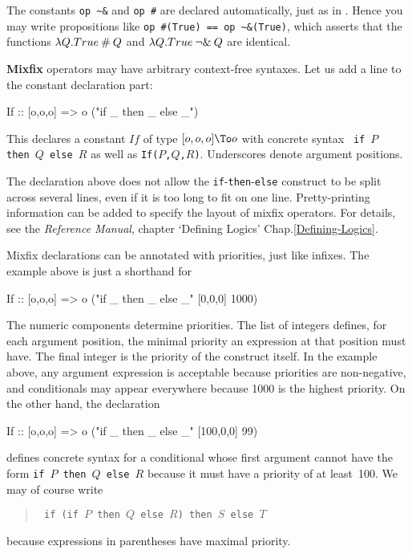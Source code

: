 The constants \hbox{\verb|op ~&|} and \hbox{\verb|op #|} are declared
automatically, just as in \ML.  Hence you may write propositions like
\verb|op #(True) == op ~&(True)|, which asserts that the functions $\lambda
Q.True \mathbin{\#} Q$ and $\lambda Q.True \mathbin{\lnot\&} Q$ are identical.

\bigskip{}
{\bf Mixfix} operators may have arbitrary context-free syntaxes.  Let us
add a line to the constant declaration part:
\begin{ttbox}
        If :: [o,o,o] => o       ("if _ then _ else _")
\end{ttbox}
This declares a constant $If$ of type $[o,o,o] \To o$ with concrete syntax {\tt
  if~$P$ then~$Q$ else~$R$} as well as {\tt If($P$,$Q$,$R$)}.  Underscores
denote argument positions.  

The declaration above does not allow the {\tt if}-{\tt then}-{\tt else}
construct to be split across several lines, even if it is too long to fit
on one line.  Pretty-printing information can be added to specify the
layout of mixfix operators.  For details, see
%
    {the {\it Reference Manual}, chapter `Defining Logics'}%
    {Chap.\ts\ref{Defining-Logics}}.

Mixfix declarations can be annotated with priorities, just like
infixes.  The example above is just a shorthand for
\begin{ttbox}
        If :: [o,o,o] => o       ("if _ then _ else _" [0,0,0] 1000)
\end{ttbox}
The numeric components determine priorities.  The list of integers
defines, for each argument position, the minimal priority an expression
at that position must have.  The final integer is the priority of the
construct itself.  In the example above, any argument expression is
acceptable because priorities are non-negative, and conditionals may
appear everywhere because 1000 is the highest priority.  On the other
hand, the declaration
\begin{ttbox}
        If :: [o,o,o] => o       ("if _ then _ else _" [100,0,0] 99)
\end{ttbox}
defines concrete syntax for a conditional whose first argument cannot have
the form {\tt if~$P$ then~$Q$ else~$R$} because it must have a priority
of at least~100.  We may of course write
\begin{quote}\tt
if (if $P$ then $Q$ else $R$) then $S$ else $T$
\end{quote}
because expressions in parentheses have maximal priority.  

